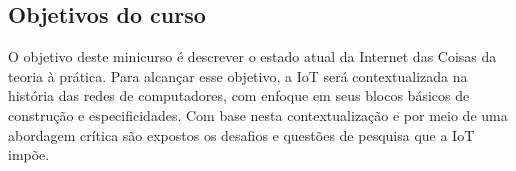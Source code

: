 \documentclass{SBCbookchapter}
\begin{document}

\subsection{Objetivos do curso}
O objetivo deste minicurso é descrever o estado atual da Internet das Coisas da 
teoria à prática. Para alcançar esse objetivo, a IoT será contextualizada na 
história das redes de computadores, com enfoque em seus blocos básicos de 
construção e especificidades. Com base nesta contextualização e por meio 
de uma abordagem crítica são expostos os desafios e questões de pesquisa que a 
IoT impõe.
\end{document}
